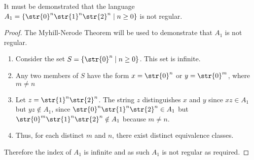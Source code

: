 It must be demonstrated that the language $A_1 = \{ \str{0}^n\str{1}^n\str{2}^n \mid n \geq 0 \}$ is not regular.
\begin{proof}
The Myhill-Nerode Theorem will be used to demonstrate that $A_1$ is not regular.
	\begin{enumerate}[label=\Roman*.]
		\item Consider the set $S = \{\str{0}^n \mid n \geq 0\}$. This set is infinite.
		\item Any two members of $S$ have the form $x = \str{0}^n$ or $y = \str{0}^m$, where $m \neq n$
		\item Let $z = \str{1}^n\str{2}^n$. The string $z$ distinguishes $x$ and $y$ since $xz \in A_1$ but $yz \notin A_1$, since $\str{0}^n\str{1}^n\str{2}^n \in A_1$ but $\str{0}^m\str{1}^n\str{2}^n \notin A_1$ because $m \neq n$.
		\item Thus, for each distinct $m$ and $n$, there exist distinct equivalence classes.
	\end{enumerate}
	Therefore the index of $A_1$ is infinite and as such $A_1$ is not regular as required.
\end{proof}